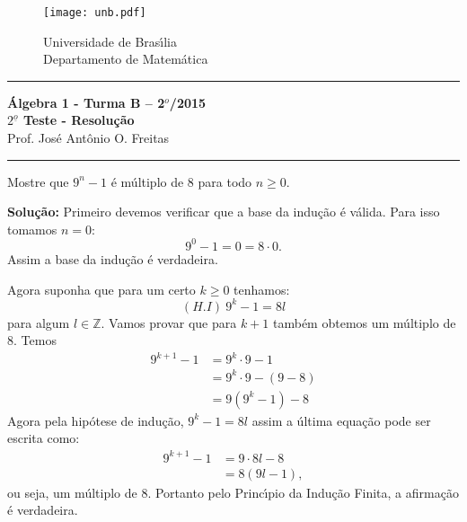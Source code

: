 \documentclass[12pt]{article}
\newcounter{exercicios}
\newcommand{\questao}{
\addtocounter{exercicios}{1}
\noindent{\bf Exerc{\'\i}cio \arabic{exercicios}: }}
\newcommand{\z}{\mathbb{Z}}
\begin{document}
\pagestyle{empty}

\begin{figure}[h]
        \begin{minipage}[c]{1.7cm}
        \texttt{[image: unb.pdf]}
        \end{minipage}%
        \hspace{0pt}
        \begin{minipage}[c]{4in}
          {Universidade de Bras{\'\i}lia} \\
          {Departamento de Matem{\'a}tica}
\end{minipage}
\end{figure}
\vspace{-1cm}\hrule

\begin{center}
{\Large\bf {\'A}lgebra 1 - Turma B -- 2$^{o}$/2015} \\ \vspace{9pt} {\large\bf
  $2^{\underline{o}}$ Teste - Resolu\c{c}\~ao}\\
\vspace{9pt} Prof. Jos{\'e} Ant{\^o}nio O. Freitas
\end{center}
\hrule

\vspace{.6cm}

\questao Mostre que $9^n - 1$ {\'e} m\'ultiplo de 8 para todo $n \ge 0$.

\noindent\textbf{Solu\c{c}\~ao:} Primeiro devemos verificar que a base da indu\c{c}\~ao \'e v\'alida. Para isso tomamos $n = 0$:
\[
	9^0 - 1 = 0 = 8\cdot 0.
\]
Assim a base da indu\c{c}\~ao \'e verdadeira.

Agora suponha que para um certo $k \ge 0$ tenhamos:
\[
	(H.I)\ 9^k - 1 = 8l
\]
para algum $l \in \z$. Vamos provar que para $k + 1$ tamb\'em obtemos um m\'ultiplo de 8. Temos
\begin{align*}
	9^{k + 1} - 1 &= 9^k\cdot 9 - 1 \\& = 9^k\cdot 9 - (9 - 8) \\ &= 9(9^k - 1) - 8
\end{align*}
Agora pela hip\'otese de indu\c{c}\~ao, $9^k - 1 = 8l$ assim a \'ultima equa\c{c}\~ao pode ser escrita como:
\begin{align*}
	9^{k + 1} - 1 &= 9\cdot 8l - 8 \\ &= 8(9l - 1),
\end{align*}
ou seja, um m\'ultiplo de 8. Portanto pelo Princ{\'\i}pio da Indu\c{c}\~ao Finita, a afirma\c{c}\~ao \'e verdadeira.
\end{document}
